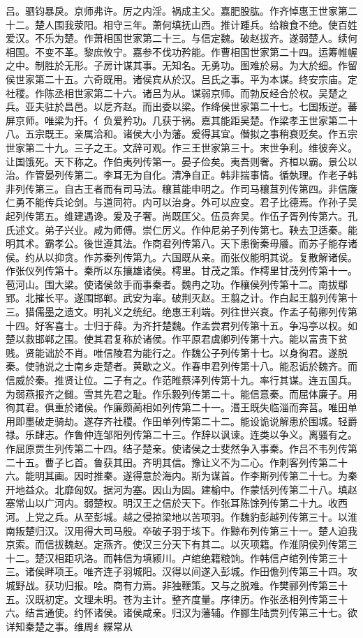 \documentclass{zhvt-classic}
\begin{document}
吕。驷钧暴戾。京师弗许。厉之内淫。祸成主父。嘉肥股肱。作齐悼惠王世家第二十二。楚人围我荥阳。相守三年。萧何填抚山西。推计踵兵。给粮食不绝。使百姓爱汉。不乐为楚。作萧相国世家第二十三。与信定魏。破赵拔齐。遂弱楚人。续何相国。不变不革。黎庶攸宁。嘉参不伐功矜能。作曹相国世家第二十四。运筹帷幄之中。制胜於无形。子房计谋其事。无知名。无勇功。图难於易。为大於细。作留侯世家第二十五。六奇既用。诸侯宾从於汉。吕氏之事。平为本谋。终安宗庙。定社稷。作陈丞相世家第二十六。诸吕为从。谋弱京师。而勃反经合於权。吴楚之兵。亚夫驻於昌邑。以戹齐赵。而出委以梁。作绛侯世家第二十七。七国叛逆。蕃屏京师。唯梁为扞。亻负爱矜功。几获于祸。嘉其能距吴楚。作梁孝王世家第二十八。五宗既王。亲属洽和。诸侯大小为藩。爰得其宜。僭拟之事稍衰贬矣。作五宗世家第二十九。三子之王。文辞可观。作三王世家第三十。末世争利。维彼奔义。让国饿死。天下称之。作伯夷列传第一。晏子俭矣。夷吾则奢。齐桓以霸。景公以治。作管晏列传第二。李耳无为自化。清净自正。韩非揣事情。循埶理。作老子韩非列传第三。自古王者而有司马法。穰苴能申明之。作司马穰苴列传第四。非信廉仁勇不能传兵论剑。与道同符。内可以治身。外可以应变。君子比德焉。作孙子吴起列传第五。维建遇谗。爰及子奢。尚既匡父。伍员奔吴。作伍子胥列传第六。孔氏述文。弟子兴业。咸为师傅。崇仁厉义。作仲尼弟子列传第七。鞅去卫适秦。能明其术。霸孝公。後世遵其法。作商君列传第八。天下患衡秦毋餍。而苏子能存诸侯。约从以抑贪。作苏秦列传第九。六国既从亲。而张仪能明其说。复散解诸侯。作张仪列传第十。秦所以东攘雄诸侯。樗里。甘茂之策。作樗里甘茂列传第十一。苞河山。围大梁。使诸侯敛手而事秦者。魏冉之功。作穰侯列传第十二。南拔鄢郢。北摧长平。遂围邯郸。武安为率。破荆灭赵。王翦之计。作白起王翦列传第十三。猎儒墨之遗文。明礼义之统纪。绝惠王利端。列往世兴衰。作孟子荀卿列传第十四。好客喜士。士归于薛。为齐扞楚魏。作孟尝君列传第十五。争冯亭以权。如楚以救邯郸之围。使其君复称於诸侯。作平原君虞卿列传第十六。能以富贵下贫贱。贤能诎於不肖。唯信陵君为能行之。作魏公子列传第十七。以身徇君。遂脱秦。使驰说之士南乡走楚者。黄歇之义。作春申君列传第十八。能忍诟於魏齐。而信威於秦。推贤让位。二子有之。作范睢蔡泽列传第十九。率行其谋。连五国兵。为弱燕报齐之雠。雪其先君之耻。作乐毅列传第二十。能信意秦。而屈体廉子。用徇其君。俱重於诸侯。作廉颇蔺相如列传第二十一。湣王既失临淄而奔莒。唯田单用即墨破走骑劫。遂存齐社稷。作田单列传第二十二。能设诡说解患於围城。轻爵禄。乐肆志。作鲁仲连邹阳列传第二十三。作辞以讽谏。连类以争义。离骚有之。作屈原贾生列传第二十四。结子楚亲。使诸侯之士斐然争入事秦。作吕不韦列传第二十五。曹子匕首。鲁获其田。齐明其信。豫让义不为二心。作刺客列传第二十六。能明其画。因时推秦。遂得意於海内。斯为谋首。作李斯列传第二十七。为秦开地益众。北靡匈奴。据河为塞。因山为固。建榆中。作蒙恬列传第二十八。填赵塞常山以广河内。弱楚权。明汉王之信於天下。作张耳陈馀列传第二十九。收西河。上党之兵。从至彭城。越之侵掠梁地以苦项羽。作魏豹彭越列传第三十。以淮南叛楚归汉。汉用得大司马殷。卒破子羽于垓下。作黥布列传第三十一。楚人迫我京索。而信拔魏赵。定燕齐。使汉三分天下有其二。以灭项籍。作淮阴侯列传第三十二。楚汉相距巩洛。而韩信为填颍川。卢绾绝籍粮饷。作韩信卢绾列传第三十三。诸侯畔项王。唯齐连子羽城阳。汉得以间遂入彭城。作田儋列传第三十四。攻城野战。获功归报。哙。商有力焉。非独鞭策。又与之脱难。作樊郦列传第三十五。汉既初定。文理未明。苍为主计。整齐度量。序律历。作张丞相列传第三十六。结言通使。约怀诸侯。诸侯咸亲。归汉为藩辅。作郦生陆贾列传第三十七。欲详知秦楚之事。维周纟緤常从
\end{document}
